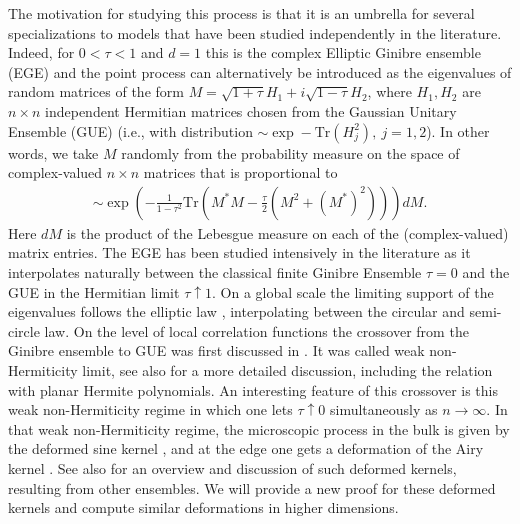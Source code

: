 \documentclass[%
 jmp,
cp,  %
 amsmath,amsthm,amssymb,%
 reprint,%
onecolumn]{revtex4-2}
\begin{document}
The motivation for studying this process is that it is an umbrella for several specializations to models that have been studied independently in the literature. Indeed, for $0< \tau < 1$ and $d=1$ this is the 
complex
Elliptic Ginibre ensemble (EGE) 
\cite{Girko,SCSS}
and the point process can alternatively be introduced as the eigenvalues of random matrices  of the form $M = \sqrt{1+\tau} H_1 + i \sqrt{1-\tau} H_2$, where $H_1, H_2$ are $n\times n$ independent Hermitian matrices chosen from the Gaussian Unitary Ensemble (GUE) (i.e., with  distribution $\sim \exp -\text{Tr}(H_j^2),\ j=1,2$). In other words, we take $M$ randomly from the probability measure on the space of complex-valued $n \times n$ matrices that is proportional to 
\begin{align}
\sim
\exp\left(- \frac{1}{1-\tau^2} \text{Tr}{\left(M^* M - \frac{\tau}{2}  \left(M^2 +(M^*)^2\right)\right)}\right) dM.
\end{align}
Here $dM$ is the product  of the Lebesgue measure on each of the (complex-valued) 
matrix 
entries. 
The EGE has been studied intensively in the literature as it interpolates naturally between the classical finite Ginibre Ensemble $\tau=0$ \cite{Ginibre} and the GUE in the Hermitian limit $\tau \uparrow 1$. 
On a global scale the limiting support of the eigenvalues follows the elliptic law \cite{Girko,SCSS}, interpolating between the circular and semi-circle law.
On the level of local correlation functions the crossover from the Ginibre ensemble to GUE was first discussed 
in \cite{FyKhSo1,FyKhSo2}. 
It was called weak non-Hermiticity limit, see also   \cite{FyKhSo3} for a more detailed discussion, including the relation with planar  Hermite polynomials. An interesting feature of this crossover is this weak non-Hermiticity regime in which one lets $\tau \uparrow 0$ simultaneously as $n \to \infty$. In that  weak non-Hermiticity regime, the microscopic process in the bulk is given by the deformed sine kernel \cite{ACV}, and at the edge one gets a deformation of the Airy kernel \cite{Be}. See also \cite{AP} for an overview and  discussion of such deformed kernels, resulting from other ensembles. We will provide a new proof for these deformed kernels and compute similar deformations in higher dimensions. 
\end{document}
